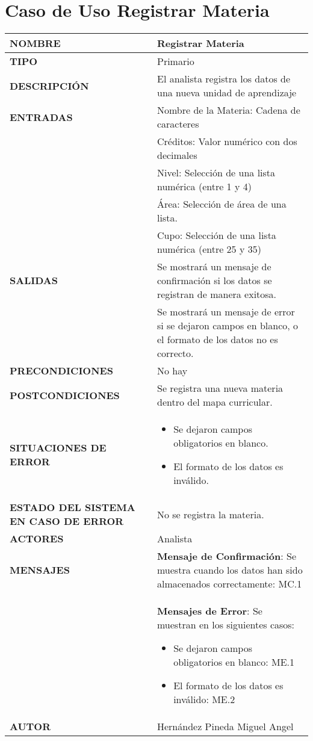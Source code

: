 \newpage
\section{Caso de Uso Registrar Materia}
\begin{longtable}{ | p{6cm} | p{10cm} |}
\hline
\textbf{NOMBRE} & Registrar Materia\\
\hline
\textbf{TIPO} & Primario\\
\hline
\textbf{DESCRIPCIÓN} & El analista registra los datos de una nueva unidad de aprendizaje\\
\hline
\textbf{ENTRADAS} & Nombre de la Materia: Cadena de caracteres\\ & Créditos: Valor numérico con dos decimales\\ & Nivel: Selección de una lista numérica (entre 1 y 4)\\ & Área: Selección de área de una lista.\\ & Cupo: Selección de una lista numérica (entre 25 y 35)\\
\hline
\textbf{SALIDAS} & Se mostrará un mensaje de confirmación si los datos se registran de manera exitosa.\\ & Se mostrará un mensaje de error si se dejaron campos en blanco, o el formato de los datos no es correcto.\\
\hline
\textbf{PRECONDICIONES} & No hay\\
\hline
\textbf{POSTCONDICIONES} & Se registra una nueva materia dentro del mapa curricular.\\
\hline
\textbf{SITUACIONES DE ERROR} & \begin{itemize}
    \item Se dejaron campos obligatorios en blanco.
    \item El formato de los datos es inválido.
\end{itemize}\\
\hline
\textbf{ESTADO DEL SISTEMA EN CASO DE ERROR} & No se registra la materia.\\
\hline
\textbf{ACTORES} & Analista\\
\hline
\textbf{MENSAJES} & \textbf{Mensaje de Confirmación}: Se muestra cuando los datos han sido almacenados correctamente: MC.1\\ & \textbf{Mensajes de Error}: Se muestran en los siguientes casos: \begin{itemize}
    \item Se dejaron campos obligatorios en blanco: ME.1
    \item El formato de los datos es inválido: ME.2
\end{itemize}\\
\hline
\textbf{AUTOR} & Hernández Pineda Miguel Angel\\
\hline
\end{longtable}
